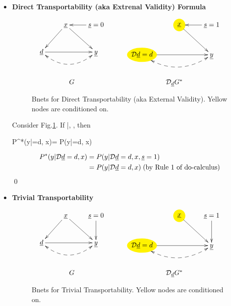 \begin{itemize}
\item{\bf Direct Transportability 
(aka Extrenal Validity) Formula}

\begin{figure}[h!]
$$
\begin{array}{ccc}
\xymatrix{
&\rvx\ar[ld]\ar[rd]
&\rvs=0\ar[l]
\\
\rvd\ar[rr]\ar@{<-->}@/_1.5pc/[rr]
&&\rvy
}
&
\;\;\;\;
&
\xymatrix{
&*++[o][F*:yellow]{\rvx}\ar[rd]
&\rvs=1\ar[l]
\\
*++[o][F*:yellow]{\cald\rvd=d}\ar[rr]
\ar@{<-->}@/_1.5pc/[rr]
&&\rvy
}
\\
\\
\\
G&&\cald_\rvd G^*
\end{array}
$$
\caption{Bnets for Direct Transportability
(aka External Validity).
Yellow nodes are conditioned on.}
\label{fig-direct-trans}
\end{figure}

\begin{claim} Consider Fig.\ref{fig-direct-trans}. If 
\beq
\rvy\perp \rvs|\rvx, \rvd
\;\;\;\;
\;,
\eeq
then

\beq
P^*(y|\cald\rvd=d, x)=
P(y|\cald\rvd=d, x)
\eeq
\end{claim}
\proof
\begin{align}
P^*(y|{\cal D}{\underline{d}}=d, x)
&=
P(y|{\cal D}{\underline{d}}=d, x, {\underline{s}}=1)
\\
&=
P(y|{\cal D}{\underline{d}}=d, x)\;\text{(by Rule 1 of do-calculus)}
\end{align}
\qed
\item {\bf Trivial Transportability}

\begin{figure}[h!]
$$
\begin{array}{ccc}
\xymatrix{
&\rvx\ar[ld]\ar[rd]
&\rvs=0\ar[d]
\\
\rvd\ar[rr]\ar@{<-->}@/_1.5pc/[rr]
&&\rvy
}
&
\;\;\;\;
&
\xymatrix{
&*++[o][F*:yellow]{\rvx}\ar[rd]
&\rvs=1\ar[d]
\\
*++[o][F*:yellow]{\cald\rvd=d}\ar[rr]
\ar@{<-->}@/_1.5pc/[rr]
&&\rvy
}
\\
\\
\\
G&&\cald_\rvd G^*
\end{array}
$$
\caption{Bnets for Trivial Transportability.
Yellow nodes are conditioned on.}
\label{fig-trivial-trans}
\end{figure}


\end{itemize}

